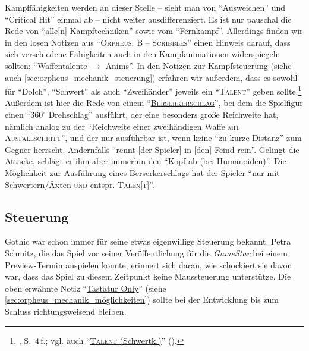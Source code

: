 \documentclass[a5paper,pagesize,numbers=noenddot]{scrbook}
\begin{document}
Kampffähigkeiten werden an dieser Stelle -- sieht man von \enquote{Ausweichen}\autocite[S.~5]{orpheus_gildensystem} und \enquote{Critical Hit}\autocite[S.~1]{orpheus_gildensystem} einmal ab -- nicht weiter ausdifferenziert.
Es ist nur pauschal die Rede von \enquote{\uline{alle[n]} Kampftechniken}\autocite[S.~8]{orpheus_gildensystem} sowie vom \enquote{Fernkampf}.\autocite[S.~13, 15]{orpheus_gildensystem}
Allerdings finden wir in den losen Notizen aus \enquote{\textsc{Orpheus. B -- Scribbles}} einen Hinweis darauf, dass sich verschiedene Fähigkeiten auch in den Kampfanimationen widerspiegeln sollten:
\enquote{Waffentalente $\rightarrow$ Anims}.\autocite[S.~7]{orpheus_b_scribbles}
In den Notizen zur Kampfsteuerung (siehe auch \autoref{sec:orpheus_mechanik_steuerung}) erfahren wir außerdem, dass es sowohl für \enquote{Dolch}, \enquote{Schwert} als auch \enquote{Zweihänder} jeweils ein \enquote{\textsc{Talent}} geben sollte.\footnote{\autocite{orpheus_kampfsteuerung}, S.~4\,f.; vgl. auch \enquote{\uline{\textsc{Talent} (Schwertk.)}} (\autocite[S.~1]{orpheus_kampfsteuerung}).}
Außerdem ist hier die Rede von einem \enquote{\textsc{\uline{Berserkerschlag}}}, bei dem die Spielfigur einen \enquote{360$^{\circ}$ Drehschlag} ausführt,\autocite[S.~1]{orpheus_kampfsteuerung} der eine besonders große Reichweite hat, nämlich analog zu der \enquote{Reichweite einer zweihändigen Waffe \textsc{mit Ausfallschritt}}, und der nur ausführbar ist, wenn keine \enquote{zu kurze Distanz} zum Gegner herrscht.
Andernfalls \enquote{rennt [der Spieler] in [den] Feind rein}.
Gelingt die Attacke, schlägt er ihm aber immerhin den \enquote{Kopf ab (bei Humanoiden)}.
Die Möglichkeit zur Ausführung eines Berserkerschlags hat der Spieler \enquote{nur mit Schwertern/Äxten \textsc{und} entspr. \textsc{Talen[t]}}.\autocite[S.~3]{orpheus_kampfsteuerung}





\subsection{Steuerung}\label{sec:orpheus_mechanik_steuerung}
Gothic war schon immer für seine etwas eigenwillige Steuerung bekannt.
Petra Schmitz, die das Spiel vor seiner Veröffentlichung für die \textit{GameStar} bei einem Preview-Termin anspielen konnte, erinnert sich daran, wie schockiert sie davon war, dass das Spiel zu diesem Zeitpunkt keine Maussteuerung unterstütze.\autocite{schmitz_maussteuerung_2021}
Die oben erwähnte Notiz \enquote{\uline{Tastatur Only}}\autocite[S.~1]{orpheus_interface} (siehe \autoref{sec:orpheus_mechanik_möglichkeiten}) sollte bei der Entwicklung bis zum Schluss richtungsweisend bleiben.
\end{document}
